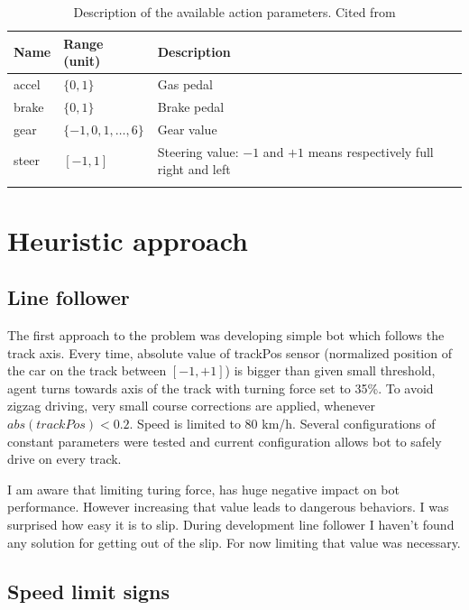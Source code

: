 \documentclass[declaration,shortabstract,english,inz]{iithesis}
\begin{document}
\begin{center}
    \begin{longtable}{ | p{} |p{}| p{} |}
    \hline
    \textbf{Name} & \textbf{Range (unit)} & \textbf{Description}  \\ 
    \hline
    accel & $\{0,1\}$ & Gas pedal \\ 
     \hline
     brake &  $\{0,1\}$ & Brake pedal \\ 
     \hline
     gear & $\{-1,0,1,\dots ,6\}$ & Gear value \\ 
     \hline
     steer &  $[-1,1]$ & Steering value: $-1$ and $+1$ means respectively full right and
     left \\ 
     \hline
     \caption{\label{tab:torcs_actions}Description of the available  action parameters. Cited from \cite{scrc_manual}}
    \end{longtable}
\end{center}

\chapter{Heuristic approach}

\section{Line follower}

The first approach to the problem was developing simple bot which follows the track axis.
Every time, absolute value of trackPos sensor (normalized position of the car on the track between $[-1, +1]$) is bigger than given small threshold, agent turns towards axis of the track with turning force set to 35\%.
To avoid zigzag driving, very small course corrections are applied, whenever $abs(trackPos) < 0.2$.
Speed is limited to 80 km/h.
Several configurations of constant parameters were tested and current configuration allows bot to safely drive on every track.


I am aware that limiting turing force, has huge negative impact on bot performance.
However increasing that value leads to dangerous behaviors.
I was surprised how easy it is to slip.
During development line follower I haven't found any solution for getting out of the slip.
For now limiting that value was necessary.

\section{Speed limit signs}
\end{document}
